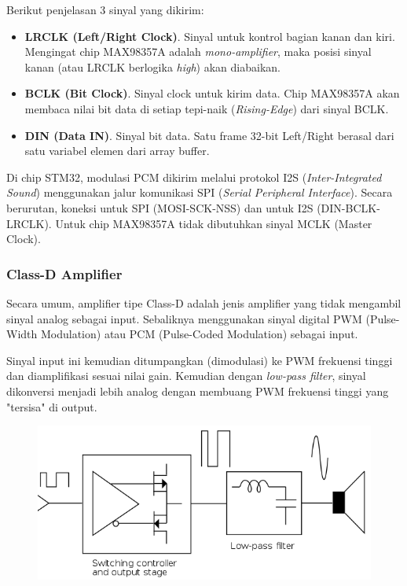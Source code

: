 \documentclass[12pt,]{article}
\begin{document}
	Berikut penjelasan 3 sinyal yang dikirim:
	\begin{itemize}
		\item \textbf{LRCLK (Left/Right Clock)}. Sinyal untuk kontrol bagian kanan dan kiri.
		Mengingat chip MAX98357A adalah \textit{mono-amplifier},
		maka posisi sinyal kanan (atau LRCLK berlogika \textit{high}) akan diabaikan.
		
		\item \textbf{BCLK (Bit Clock)}. Sinyal clock untuk kirim data.
		Chip MAX98357A akan membaca nilai bit data di setiap tepi-naik (\textit{Rising-Edge})
		dari sinyal BCLK.
		
		\item \textbf{DIN (Data IN)}. Sinyal bit data. 
		Satu frame 32-bit Left/Right berasal dari satu variabel elemen dari array buffer. 
	\end{itemize}
	
	Di chip STM32, modulasi PCM dikirim melalui protokol I2S (\textit{Inter-Integrated Sound})
	menggunakan jalur komunikasi SPI (\textit{Serial Peripheral Interface}).
	Secara berurutan, koneksi untuk SPI (MOSI-SCK-NSS) dan untuk I2S (DIN-BCLK-LRCLK).
	Untuk chip MAX98357A tidak dibutuhkan sinyal MCLK (Master Clock).
	
	\subsubsection{Class-D Amplifier}
	
	Secara umum, amplifier tipe Class-D adalah jenis amplifier yang tidak mengambil sinyal analog sebagai input.
	Sebaliknya menggunakan sinyal digital PWM (Pulse-Width Modulation) atau PCM (Pulse-Coded Modulation) sebagai input.
	
	Sinyal input ini kemudian ditumpangkan (dimodulasi) ke PWM frekuensi tinggi dan diamplifikasi sesuai nilai gain.
	Kemudian dengan \textit{low-pass filter}, sinyal dikonversi menjadi lebih analog
	dengan membuang PWM frekuensi tinggi yang "tersisa" di output.
	\begin{figure}[H]
		\centering
		\includegraphics[width=0.6\linewidth]{images/classD}
	\end{figure}
\end{document}

